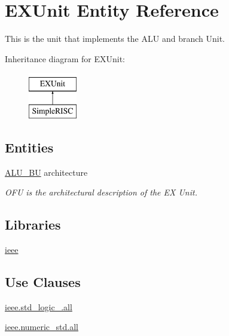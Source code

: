 \hypertarget{class_e_x_unit}{\section{E\-X\-Unit Entity Reference}
\label{class_e_x_unit}
}


This is the unit that implements the A\-L\-U and branch Unit.  


Inheritance diagram for E\-X\-Unit\-:\begin{figure}[H]
\begin{center}
\leavevmode
\includegraphics[height=2.000000cm]{class_e_x_unit}
\end{center}
\end{figure}
\subsection*{Entities}
\begin{DoxyCompactItemize}
\item 
\hyperlink{class_e_x_unit_1_1_a_l_u___b_u}{A\-L\-U\-\_\-\-B\-U} architecture
\begin{DoxyCompactList}\small\item\em O\-F\-U is the architectural description of the E\-X Unit. \end{DoxyCompactList}\end{DoxyCompactItemize}
\subsection*{Libraries}
 \begin{DoxyCompactItemize}
\item 
\hypertarget{class_e_x_unit_a0a6af6eef40212dbaf130d57ce711256}{\hyperlink{class_e_x_unit_a0a6af6eef40212dbaf130d57ce711256}{ieee} }\label{class_e_x_unit_a0a6af6eef40212dbaf130d57ce711256}

\end{DoxyCompactItemize}
\subsection*{Use Clauses}
 \begin{DoxyCompactItemize}
\item 
\hypertarget{class_e_x_unit_a43ecb358105806229eb7a3074fc4d577}{\hyperlink{class_e_x_unit_a43ecb358105806229eb7a3074fc4d577}{ieee.\-std\-\_\-logic\-\_.\-all}   }\label{class_e_x_unit_a43ecb358105806229eb7a3074fc4d577}

\item 
\hypertarget{class_e_x_unit_a631689596594b2068e0ee8dadd0931fe}{\hyperlink{class_e_x_unit_a631689596594b2068e0ee8dadd0931fe}{ieee.\-numeric\-\_\-std.\-all}   }\label{class_e_x_unit_a631689596594b2068e0ee8dadd0931fe}

\end{DoxyCompactItemize}
